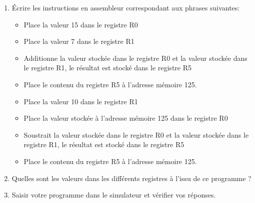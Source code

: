 \documentclass[11pt,a4paper]{article}
\begin{document}
\begin{enumerate}
\item Écrire les instructions en assembleur correspondant aux phrases suivantes:
\begin{itemize}
\item Place la valeur 15 dans le registre R0 \vspace{1cm}
\item Place la valeur 7 dans le registre R1 \vspace{1cm}
\item Additionne la valeur stockée dans le registre R0 et la valeur stockée dans le registre R1, le résultat est stocké dans le registre R5 \vspace{1cm}
\item Place le contenu du registre R5 à l'adresse mémoire 125. \vspace{1cm}
\item Place la valeur 10 dans le registre R1 \vspace{1cm}
\item Place la valeur stockée à l'adresse mémoire 125 dans le registre R0 \vspace{1cm}
\item Soustrait la valeur stockée dans le registre R0 et la valeur stockée dans le registre R1, le résultat est stocké dans le registre R5 \vspace{1cm}
\item Place le contenu du registre R5 à l'adresse mémoire 125. \vspace{1cm}
\end{itemize}
\item Quelles sont les valeurs dans les différents registres à l'issu de ce programme ? \vspace{2cm}
\item Saisir votre programme dans le simulateur et vérifier vos réponses.
\end{enumerate}
\end{document}
